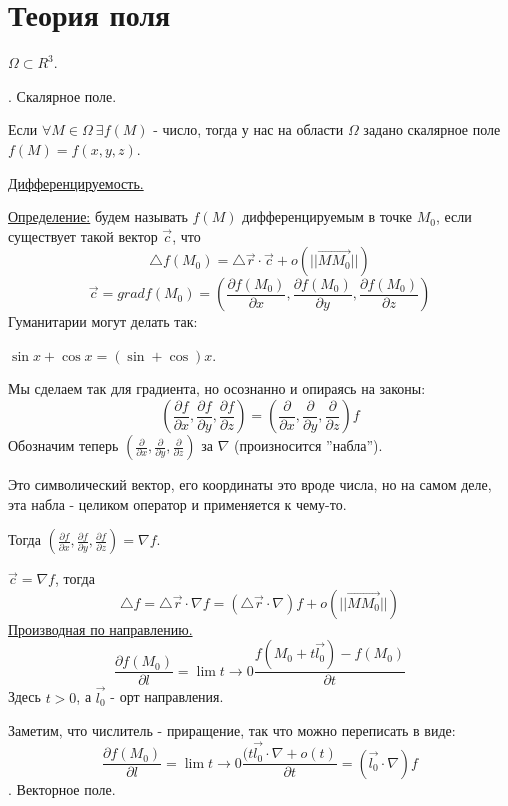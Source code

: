\documentclass[12pt]{article}
\begin{document}
\section{Теория поля}
$\Omega \subset R^3$.\par
{}. Скалярное поле.\par
Если $\forall M \in \Omega \ \exists f(M)$ - число, тогда у нас на области $\Omega$ задано скалярное поле $f(M) = f(x,y,z)$.\par
\uline{Дифференцируемость.}\par
\uline{Определение:} будем называть $f(M)$ дифференцируемым в точке $M_0$, если существует такой вектор $\overrightarrow{c}$, что
$${\bigtriangleup f}(M_0) = {\bigtriangleup \overrightarrow{r}} \cdot \overrightarrow{c} + o(||\overrightarrow{MM_0}||)$$
$$\overrightarrow{c} = grad f(M_0) = (\frac{\partial f(M_0)}{\partial x}, \frac{\partial f(M_0)}{\partial y}, \frac{\partial f(M_0)}{\partial z})$$
Гуманитарии могут делать так:\par
$\sin x + \cos x = (\sin+\cos)x$.\par
Мы сделаем так для градиента, но осознанно и опираясь на законы:
$$(\frac{\partial f}{\partial x},\frac{\partial f}{\partial y}, \frac{\partial f}{\partial z}) = (\frac{\partial}{\partial x},\frac{\partial}{\partial y},\frac{\partial}{\partial z})f$$
Обозначим теперь $(\frac{\partial}{\partial x},\frac{\partial}{\partial y},\frac{\partial}{\partial z})$ за $\nabla$ (произносится ''набла'').\par
Это символический вектор, его координаты это вроде числа, но на самом деле, эта набла - целиком оператор и применяется к чему-то.\par
Тогда $(\frac{\partial f}{\partial x},\frac{\partial f}{\partial y}, \frac{\partial f}{\partial z}) = {\nabla f}$.\par
$\overrightarrow{c} = {\nabla f}$, тогда
$${\bigtriangleup f} = {\bigtriangleup \overrightarrow{r}} \cdot {\nabla f} = ({\bigtriangleup \overrightarrow{r}} \cdot {\nabla})f + o(||\overrightarrow{MM_0}||)$$
\uline{Производная по направлению.}
$$\frac{\partial f (M_0)}{\partial l} = \lim{t\to 0} \frac{f(M_0+t\overrightarrow{l_0})-f(M_0)}{\partial t}$$
Здесь $t > 0$, а $\overrightarrow{l_0}$ - орт направления.\par
Заметим, что числитель - приращение, так что можно переписать в виде:
$$\frac{\partial f (M_0)}{\partial l} = \lim{t\to 0} \frac{(t \overrightarrow{l_0} \cdot \nabla + o(t)}{\partial t} = (\overrightarrow{l_0} \cdot \nabla)f$$
. Векторное поле.\par
\end{document}
